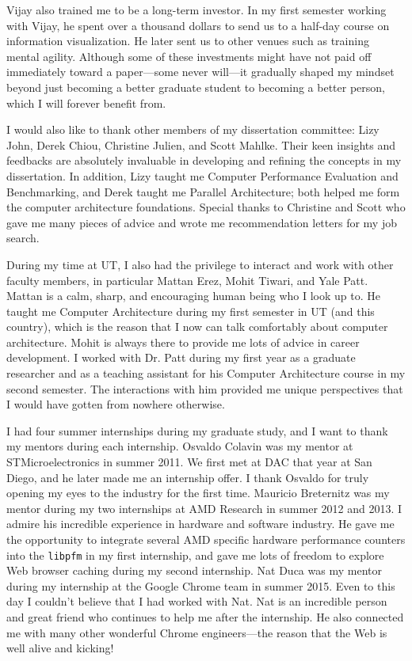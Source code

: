 \begin{acknowledgments}
Vijay also trained me to be a long-term investor. In my first semester working with Vijay, he spent over a thousand dollars to send us to a half-day course on information visualization. He later sent us to other venues such as training mental agility. Although some of these investments might have not paid off immediately toward a paper---some never will---it gradually shaped my mindset beyond just becoming a better graduate student to becoming a better person, which I will forever benefit from.

I would also like to thank other members of my dissertation committee: Lizy John, Derek Chiou, Christine Julien, and Scott Mahlke. Their keen insights and feedbacks are absolutely invaluable in developing and refining the concepts in my dissertation. In addition, Lizy taught me Computer Performance Evaluation and Benchmarking, and Derek taught me Parallel Architecture; both helped me form the computer architecture foundations. Special thanks to Christine and Scott who gave me many pieces of advice and wrote me recommendation letters for my job search.

During my time at UT, I also had the privilege to interact and work with other faculty members, in particular Mattan Erez, Mohit Tiwari, and Yale Patt. Mattan is a calm, sharp, and encouraging human being who I look up to. He taught me Computer Architecture during my first semester in UT (and this country), which is the reason that I now can talk comfortably about computer architecture. Mohit is always there to provide me lots of advice in career development. I worked with Dr. Patt during my first year as a graduate researcher and as a teaching assistant for his Computer Architecture course in my second semester. The interactions with him provided me unique perspectives that I would have gotten from nowhere otherwise.

I had four summer internships during my graduate study, and I want to thank my mentors during each internship. Osvaldo Colavin was my mentor at STMicroelectronics in summer 2011. We first met at DAC that year at San Diego, and he later made me an internship offer. I thank Osvaldo for truly opening my eyes to the industry for the first time. Mauricio Breternitz was my mentor during my two internships at AMD Research in summer 2012 and 2013. I admire his incredible experience in hardware and software industry. He gave me the opportunity to integrate several AMD specific hardware performance counters into the \texttt{libpfm} in my first internship, and gave me lots of freedom to explore Web browser caching during my second internship. Nat Duca was my mentor during my internship at the Google Chrome team in summer 2015. Even to this day I couldn't believe that I had worked with Nat. Nat is an incredible person and great friend who continues to help me after the internship. He also connected me with many other wonderful Chrome engineers---the reason that the Web is well alive and kicking!


\end{acknowledgments}
